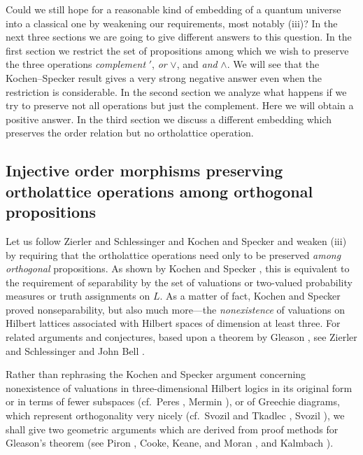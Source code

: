 Could we still hope for a reasonable kind of embedding of a quantum
universe into a classical one by weakening our requirements, most notably
(iii)?
In the next three sections we are going to give different answers
to this question. In the first section we restrict the set of propositions
among which we wish to preserve the three operations {\em complement} $'$,
{\em or} $\vee$, and {\em and} $\wedge$. We will see that the
Kochen--Specker
result gives a very strong negative answer even when the restriction is
considerable. In the second section we analyze what happens if we try to
preserve not all operations but just the complement. Here we will obtain
a positive answer.
In the third section we discuss a different embedding which preserves the
order relation but no ortholattice operation.





\subsection{Injective order morphisms preserving ortholattice operations
among orthogonal propositions}

Let us follow Zierler and Schlessinger \cite{ZirlSchl-65} and Kochen and
Specker \cite{kochen1} and weaken (iii) by requiring that the
ortholattice operations need only to be preserved {\em among orthogonal}
propositions. As shown by Kochen and
Specker \cite{kochen1}, this is equivalent to the requirement of
separability by the  set of valuations or two-valued probability measures
or truth assignments on $L$.
As a matter of fact, Kochen and Specker \cite{kochen1} proved
nonseparability, but also much
more---the {\em nonexistence} of valuations on Hilbert lattices associated
with Hilbert spaces of dimension at least three. For related arguments
and conjectures, based upon a theorem by Gleason \cite{Gleason}, see
Zierler and Schlessinger \cite{ZirlSchl-65} and John Bell \cite{bell-66}.


Rather than rephrasing the Kochen and Specker argument
\cite{kochen1} concerning nonexistence
of valuations in three-dimensional Hilbert logics in its original form
or in terms of fewer
subspaces (cf.\ Peres \cite{peres}, Mermin \cite{mermin-93}), or of Greechie
diagrams, which represent orthogonality very nicely
(cf.\ Svozil and Tkadlec \cite{svozil-tkadlec},
Svozil \cite{svozil-ql}), we shall give two geometric
arguments which are derived from proof methods for Gleason's theorem
(see Piron \cite{piron-76}, Cooke, Keane, and Moran \cite{c-k-m},
and Kalmbach \cite{kalmbach-86}).


